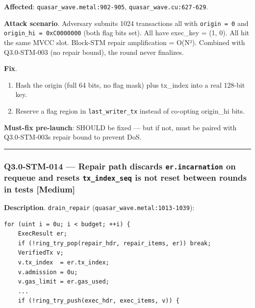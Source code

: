 \documentclass[
]{article}
\providecommand{\tightlist}{%
  \setlength{\itemsep}{0pt}\setlength{\parskip}{0pt}}
\begin{document}
\textbf{Affected}: \texttt{quasar\_wave.metal:902-905},
\texttt{quasar\_wave.cu:627-629}.

\textbf{Attack scenario}. Adversary submits 1024 transactions all with
\texttt{origin\ =\ 0} and \texttt{origin\_hi\ =\ 0xC0000000} (both flag
bits set). All have exec\_key = (1, 0). All hit the same MVCC slot.
Block-STM repair amplification = O(N²). Combined with Q3.0-STM-003 (no
repair bound), the round never finalizes.

\textbf{Fix}.

\begin{enumerate}
\def\labelenumi{\arabic{enumi}.}
\tightlist
\item
  Hash the origin (full 64 bits, no flag mask) plus tx\_index into a
  real 128-bit key.
\item
  Reserve a flag region in \texttt{last\_writer\_tx} instead of
  co-opting origin\_hi bits.
\end{enumerate}

\textbf{Must-fix pre-launch}: SHOULD be fixed --- but if not, must be
paired with Q3.0-STM-003\textquotesingle s repair bound to prevent DoS.

\begin{center}\rule{0.5\linewidth}{0.5pt}\end{center}

\subsubsection{\texorpdfstring{Q3.0-STM-014 --- Repair path discards
\texttt{er.incarnation} on requeue and resets \texttt{tx\_index\_seq} is
not reset between rounds in tests
{[}Medium{]}}{Q3.0-STM-014 --- Repair path discards er.incarnation on requeue and resets tx\_index\_seq is not reset between rounds in tests {[}Medium{]}}}\label{q30-stm-014--repair-path-discards-erincarnation-on-requeue-and-resets-tx_index_seq-is-not-reset-between-rounds-in-tests-medium}

\textbf{Description}. \texttt{drain\_repair}
(\texttt{quasar\_wave.metal:1013-1039}):

\begin{verbatim}
for (uint i = 0u; i < budget; ++i) {
    ExecResult er;
    if (!ring_try_pop(repair_hdr, repair_items, er)) break;
    VerifiedTx v;
    v.tx_index  = er.tx_index;
    v.admission = 0u;
    v.gas_limit = er.gas_used;
    ...
    if (!ring_try_push(exec_hdr, exec_items, v)) {
\end{verbatim}
\end{document}
